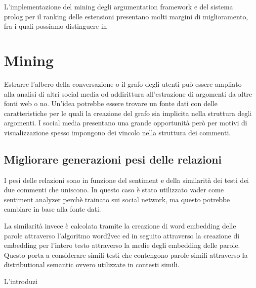 


L'implementazione del mining degli argumentation framework e del sistema prolog per il ranking delle estensioni presentano molti margini di miglioramento, fra i quali possiamo distinguere in 


\section{Mining}
\label{section:ranking}
Estrarre l'albero della conversazione o il grafo degli utenti può essere ampliato alla analisi di altri social media od addirittura all'estrazione di argomenti da altre fonti web o no. Un'idea potrebbe essere trovare un fonte dati con delle caratteristiche per le quali la creazione del grafo sia implicita nella struttura degli argomenti. I social media presentano una grande opportunità però per motivi di visualizzazione spesso impongono dei vincolo nella struttura dei commenti. 

\subsection {Migliorare generazioni pesi delle relazioni} 
I pesi delle relazioni sono in funzione del sentiment e della similarità dei testi dei due commenti che uniscono. In questo caso è stato utilizzato vader \cite{hutto2014vader} come sentiment analyzer perchè trainato sui social network, ma questo potrebbe cambiare in base alla fonte dati.

La similarità invece è calcolata tramite la creazione di word embedding delle parole attraverso l'algoritmo word2vec \cite{} ed in seguito attraverso la creazione di embedding per l'intero testo attraverso la medie degli embedding delle parole. Questo porta a considerare simili testi che contengono parole simili attraverso la distributional semantic ovvero utilizzate in contesti simili.

L'introduzi





